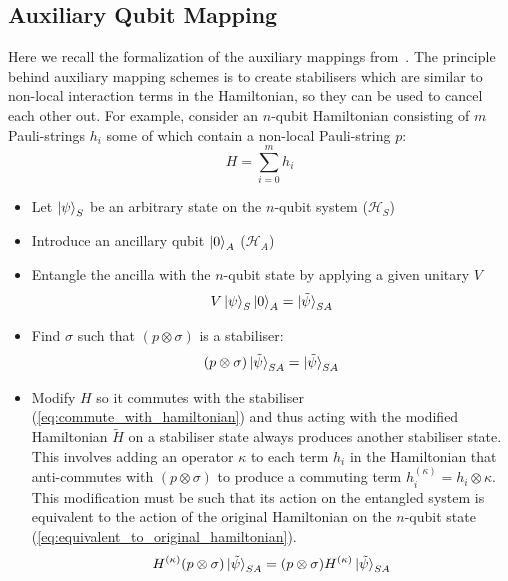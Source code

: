 \documentclass[pdftex,pra,aps,twocolumn,twoside]{revtex4-1}
\theoremstyle{plain}
\theoremstyle{note}
\newcommand\+{{\footnotesize \raisebox{0.3ex}{+}}}
\begin{document}
\subsection{Auxiliary Qubit Mapping}
\label{section:auxillaryMappings}
Here we recall the formalization of the auxiliary mappings from~\cite{steudtner2019quantum}. The principle behind auxiliary mapping schemes is to create stabilisers which are similar to non-local interaction terms in the Hamiltonian, so they can be used to cancel each other out. For example, consider an $n$-qubit Hamiltonian consisting of $m$ Pauli-strings $h_i$ some of which contain a non-local Pauli-string $p$:
\begin{equation}
    H = \sum_{i=0}^m h_i
\end{equation}
\begin{itemize}
\item Let $\ket{\psi}_S$ be an arbitrary state on the $n$-qubit system ($\mathcal{H}_S$)
\item Introduce an ancillary qubit $\ket{0}_A$ ($\mathcal{H}_A$)
\item Entangle the ancilla with the $n$-qubit state by applying a given unitary $V$
\begin{equation}
    V \ket{\psi}_S \ket{0}_A = \ket{\tilde \psi}_{SA}
\end{equation}
\item Find $\sigma$ such that $(p \otimes \sigma)$ is a stabiliser:
\begin{equation}
    (p \otimes \sigma) \ket{\tilde \psi}_{SA} = \ket{\tilde \psi}_{SA}
\end{equation}
\item Modify $H$ so it commutes with the stabiliser (\ref{eq:commute_with_hamiltonian}) and thus acting with the modified Hamiltonian $\tilde H$ on a stabiliser state always produces another stabiliser state. This involves adding an operator $\kappa$ to each term $h_i$ in the Hamiltonian that anti-commutes with $(p \otimes \sigma)$ to produce a commuting term $h_i^{(\kappa)} = h_i \otimes \kappa$. This modification must be such that its action on the entangled system is equivalent to the action of the original Hamiltonian on the $n$-qubit state (\ref{eq:equivalent_to_original_hamiltonian}).
\begin{equation}
\label{eq:commute_with_hamiltonian}
    H^{(\kappa)}(p \otimes \sigma)  \ket{\tilde \psi}_{SA} =(p \otimes \sigma)  H^{(\kappa)}\ket{\tilde \psi}_{SA}  
\end{equation}
\begin{equation}

\end{equation}
\end{itemize}
\end{document}
